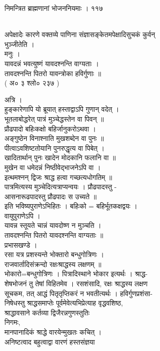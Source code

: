 \documentclass[11pt, openany]{book}
\begin{document}
{निमन्त्रित ब्राह्मणानां भोजननियमाः । ११७}{\\
अपेक्षादेः कारणे वक्तव्ये पाणिना संज्ञासङ्केतमपेक्षादिसुचकं कुर्वन्\\
भुञ्जीतेति ।\\
मनुः ।\\
यावदन्नं भवत्युष्णं यावदश्नन्ति वाग्यताः ।\\
तावदश्नन्ति पितरो यावन्त्रोका हविर्गुणाः ॥\\
( अ० ३ श्लो० २३७ )

{अत्रि ।\\
हुङ्कारेणापि यो ब्रूयात् हस्ताद्वाऽपि गुणान् वदेत् ।\\
भूतलाबोद्धरेत् पात्रं मुञ्चेद्धस्तेन वा पिवन् ॥\\
प्रौढपादो बहिःकक्षो बहिर्जानुकरोऽथवा ।\\
अङ्गुष्ठेन विनाश्नाति मुखशब्देन वा पुनः ॥\\
पीत्वाऽवशिष्टतोयानि पुनरुद्धृत्य वा पिबेत् ।\\
खादितार्थान् पुनः खादेन मोदकानि फलानि वा ॥\\
मुखेन वा धमेदन्नं निष्ठीवेद्भाजनेऽपि वा ।\\
इत्थमश्नन् द्विजः श्राद्ध हत्वा गच्छत्यधोगतिम् ॥\\
पात्रमित्यस्य मुञ्चेदित्यत्राप्यन्वयः । प्रौढपादस्तु -\\
आसनारूढपादस्तु प्रौढपादः स उच्यते ॥\\
इति भविष्यपुराणेऽभिहितः । बहिःको = बहिर्भूतकक्षद्वयः ।\\
वायुपुराणेऽपि ।\\
यावन्न स्तूयते चान्नं यावदोष्ण न मुञ्चति ।\\
तावदश्नन्ति पितरो यावदश्नन्ति वाग्यताः ॥\\
प्रभासखण्डे ।\\
रसा यत्र प्रशस्यन्ते भोक्तारो बन्धुगोत्रिणः ।\\
राजवार्तादिसंक्रन्दो रक्षःश्राद्धस्य लक्षणम् ॥\\
भोकारो=बन्धुगोत्रिणः । पित्रादिस्थाने भोकार इत्यर्थः । श्राद्ध-\\
शेषभोजनं तु तेषां विहितमेव । रसशंसादि, रक्षः श्राद्धस्य लक्षण\\
सूचकम, तत् आद्धं पितृतृप्तिकरं न भवतीत्यर्थः । हविर्गुणप्रशंसा-\\
निषेधस्तु श्राद्धसमाप्तेः पूर्वमेवेत्यभिप्रेत्याह वृद्धवशिष्ठ,\\
श्राद्धावसाने कर्तव्या द्विजैरन्नगुणस्तुतिः \textbar{}\\
निगमः,\\
मानपानादिकं श्राद्धे वारयेन्मुखतः कचित् ।\\
अनिष्टत्वाद बहुत्वाद्वा वारणं हस्तसंज्ञया \textbar{}\textbar{}}

}
\end{document}
